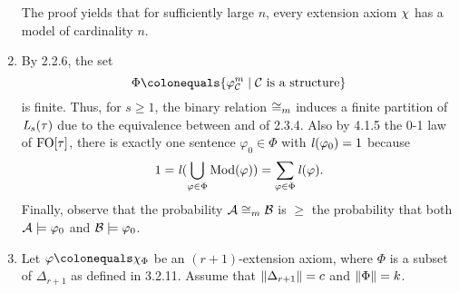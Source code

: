 \begin{enumerate}[1.]
\begin{note}
The proof yields that for sufficiently large $n$, every extension axiom $\extaxm$ has a model of cardinality $n$.
\end{note}
%
\item {} By 2.2.6, the set
\[
\Phi \defas \sett{\hint{m}{\strct{C}}}{\mathmode{\strct{C}} is a structure}
\]
is finite. Thus, for $s \geq 1$, the binary relation $\isom_m$ induces a finite partition of $\mathit{L}_{s}(\tau)$ due to the equivalence between  and  of 2.3.4. Also by 4.1.5 the 0-1 law of $\folog\of{\tau}$, there is exactly one sentence $\varphi_0 \in \Phi$ with $\lprob(\varphi_0) = 1$ because
\[
1 = \lprob(\bunion_{\varphi \in \Phi} \modclass(\varphi)) = \sum_{\varphi \in \Phi} \lprob(\varphi).
\]
Finally, observe that the probability $\strct{A} \isom_m \strct{B}$ is $\geq$ the probability that both $\mathcal{A} \models \varphi_0$ and $\mathcal{B} \models \varphi_0$.
%
\item {} Let $\varphi \defas \extaxm[\Phi]$ be an $(r + 1)$-extension axiom, where $\Phi$ is a subset of $\Delta_{r + 1}$ as defined in 3.2.11. Assume that $\|\Delta_{r + 1}\| = c$ and $\|\Phi\| = k$.


\end{enumerate}
